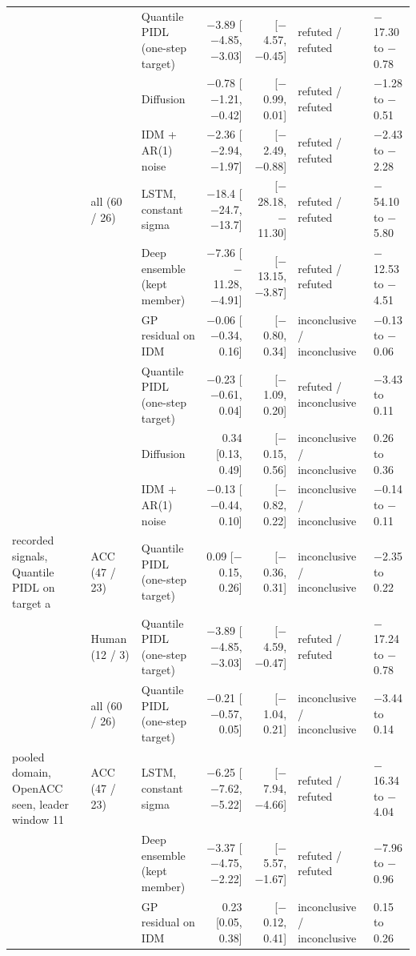 \begin{longtable}{lllrrll}
 &  & Quantile PIDL (one-step target) & $-$3.89 [$-$4.85, $-$3.03] & [$-$4.57, $-$0.45] & refuted / refuted & $-$17.30 to $-$0.78 \\
 &  & Diffusion & $-$0.78 [$-$1.21, $-$0.42] & [$-$0.99, 0.01] & refuted / refuted & $-$1.28 to $-$0.51 \\
 &  & IDM + AR(1) noise & $-$2.36 [$-$2.94, $-$1.97] & [$-$2.49, $-$0.88] & refuted / refuted & $-$2.43 to $-$2.28 \\
\midrule
 & all (60 / 26) & LSTM, constant sigma & $-$18.4 [$-$24.7, $-$13.7] & [$-$28.18, $-$11.30] & refuted / refuted & $-$54.10 to $-$5.80 \\
 &  & Deep ensemble (kept member) & $-$7.36 [$-$11.28, $-$4.91] & [$-$13.15, $-$3.87] & refuted / refuted & $-$12.53 to $-$4.51 \\
 &  & GP residual on IDM & $-$0.06 [$-$0.34, 0.16] & [$-$0.80, 0.34] & inconclusive / inconclusive & $-$0.13 to $-$0.06 \\
 &  & Quantile PIDL (one-step target) & $-$0.23 [$-$0.61, 0.04] & [$-$1.09, 0.20] & refuted / inconclusive & $-$3.43 to 0.11 \\
 &  & Diffusion & 0.34 [0.13, 0.49] & [$-$0.15, 0.56] & inconclusive / inconclusive & 0.26 to 0.36 \\
 &  & IDM + AR(1) noise & $-$0.13 [$-$0.44, 0.10] & [$-$0.82, 0.22] & inconclusive / inconclusive & $-$0.14 to $-$0.11 \\
\midrule
recorded signals, Quantile PIDL on target a & ACC (47 / 23) & Quantile PIDL (one-step target) & 0.09 [$-$0.15, 0.26] & [$-$0.36, 0.31] & inconclusive / inconclusive & $-$2.35 to 0.22 \\
\midrule
 & Human (12 / 3) & Quantile PIDL (one-step target) & $-$3.89 [$-$4.85, $-$3.03] & [$-$4.59, $-$0.47] & refuted / refuted & $-$17.24 to $-$0.78 \\
\midrule
 & all (60 / 26) & Quantile PIDL (one-step target) & $-$0.21 [$-$0.57, 0.05] & [$-$1.04, 0.21] & inconclusive / inconclusive & $-$3.44 to 0.14 \\
\midrule
pooled domain, OpenACC seen, leader window 11 & ACC (47 / 23) & LSTM, constant sigma & $-$6.25 [$-$7.62, $-$5.22] & [$-$7.94, $-$4.66] & refuted / refuted & $-$16.34 to $-$4.04 \\
 &  & Deep ensemble (kept member) & $-$3.37 [$-$4.75, $-$2.22] & [$-$5.57, $-$1.67] & refuted / refuted & $-$7.96 to $-$0.96 \\
 &  & GP residual on IDM & 0.23 [0.05, 0.38] & [$-$0.12, 0.41] & inconclusive / inconclusive & 0.15 to 0.26 \\

\end{longtable}
